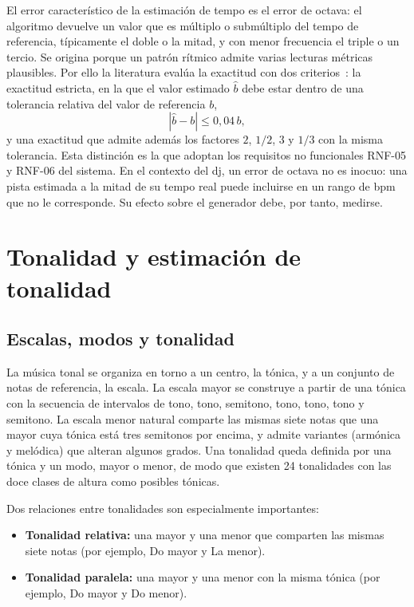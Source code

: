 El error característico de la estimación de tempo es el error de octava: el algoritmo devuelve un valor que es múltiplo o submúltiplo del tempo de referencia, típicamente el doble o la mitad, y con menor frecuencia el triple o un tercio. Se origina porque un patrón rítmico admite varias lecturas métricas plausibles. Por ello la literatura evalúa la exactitud con dos criterios~\cite{gouyon2006experimental}: la exactitud estricta, en la que el valor estimado $\hat{b}$ debe estar dentro de una tolerancia relativa del valor de referencia $b$,
\begin{equation}
  \left|\hat{b} - b\right| \le 0{,}04\, b,
  \label{eq:acc1}
\end{equation}
y una exactitud que admite además los factores $2$, $1/2$, $3$ y $1/3$ con la misma tolerancia. Esta distinción es la que adoptan los requisitos no funcionales RNF-05 y RNF-06 del sistema. En el contexto del \acs{dj}, un error de octava no es inocuo: una pista estimada a la mitad de su tempo real puede incluirse en un rango de \acs{bpm} que no le corresponde. Su efecto sobre el generador debe, por tanto, medirse.

\section{Tonalidad y estimación de tonalidad}
\label{sec:fund-tonalidad}

\subsection{Escalas, modos y tonalidad}

La música tonal se organiza en torno a un centro, la tónica, y a un conjunto de notas de referencia, la escala. La escala mayor se construye a partir de una tónica con la secuencia de intervalos de tono, tono, semitono, tono, tono, tono y semitono. La escala menor natural comparte las mismas siete notas que una mayor cuya tónica está tres semitonos por encima, y admite variantes (armónica y melódica) que alteran algunos grados. Una tonalidad queda definida por una tónica y un modo, mayor o menor, de modo que existen 24 tonalidades con las doce clases de altura como posibles tónicas.

Dos relaciones entre tonalidades son especialmente importantes:
\begin{itemize}
  \item \textbf{Tonalidad relativa:} una mayor y una menor que comparten las mismas siete notas (por ejemplo, Do mayor y La menor).
  \item \textbf{Tonalidad paralela:} una mayor y una menor con la misma tónica (por ejemplo, Do mayor y Do menor).
\end{itemize}

